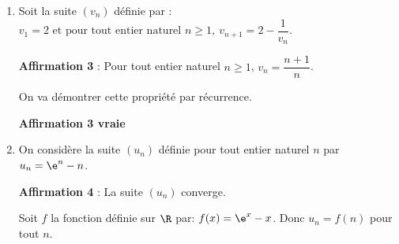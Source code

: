 \begin{enumerate}
Donc, d'après le théorème des gendarmes, on peut déduire que la suite $(u_n)$ est convergente et que $\ds\lim_{n\to +\infty} u_n=3$.

\hfill{\blue\bf Affirmation 2 vraie}	

\item Soit la suite $\left(v_n\right)$ définie par :
$ v_1=2 \text{ et pour tout entier naturel } n\geqslant1,~v_{n+1}=2-\dfrac{1}{v_n}. $
	
\textbf{Affirmation 3} : Pour tout entier naturel $n \geqslant 1$, $v_{n}=\dfrac{n+1}{n}$.
	
\smallskip
	
On va démontrer cette propriété par récurrence.

	
\hfill{\blue\bf Affirmation 3 vraie}		
	
\item On considère la suite $\left(u_n\right)$ définie pour tout entier naturel $n$ par $u_n = \e^n-n$.
	
	\textbf{Affirmation 4} : La suite $\left(u_n\right)$ converge.
	
	\smallskip
	
Soit $f$ la fonction définie sur $\R$ par: $f(x)= \e^{x}-x$. Donc $u_n=f(n)$ pour tout $n$.


\end{enumerate}
